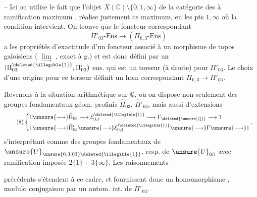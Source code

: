 
-- Ici on utilise le fait que l'objet $X(\mathbb C)\setminus\{0,1,\infty\}$ de la catégorie des  à ramification maximum , réalise justement ce maximum, en les pts $1,\infty$ où la condition intervient.
On trouve que le foncteur correspondant
\[
\tag{7 bis}
\Pi'_{03}\text{-}\mathrm{Ens}\longrightarrow(\Pi_{0,3}\text{-}\mathrm{Ens})
\]
a les propriétés d'exactitude d'un foncteur associé à un morphisme de topos galoisiens
( $\underset{\longrightarrow}{\lim}$ , exact à g.) et est donc défini par un $(\Pi_{03}^{\deleted{\illegible{1}}},\Pi'_{03})$ ens. qui est un torseur (à droite) pour $\Pi'_{03}$. Le choix d'une origine pour ce torseur définit  un hom correspondant $\Pi_{0,3}\longrightarrow\Pi'_{03}$.


Revenons à la situation arithmétique sur $\mathbb Q$, où on dispose non seulement des groupes fondamentaux géom. profinis $\widehat{\Pi}_{03}$, $\widehat{\Pi}'_{03}$, mais aussi d'extensions
\[
\tag{8}
\left\{\begin{aligned}
1&\unsure{\longrightarrow}\widehat{\Pi}_{03}\longrightarrow\mathcal E_{0,3}^{\deleted{\illegible{1}}}\longrightarrow\Gamma_{\deleted{\unsure{\mathbb Q}}}\longrightarrow1\\
1&\unsure{\longrightarrow}\widehat{\Pi}'_{03}\unsure{\longrightarrow}\mathcal E_{0,3}^{\prime\deleted{\illegible{1}}}\unsure{\longrightarrow}\Gamma\unsure{\longrightarrow}1
\end{aligned}\right.,
\]
s'interprétant comme des groupes fondamentaux de $\unsure{U}_{\unsure{0,3|03}\deleted{\illegible{1}}}$, resp. de $\unsure{U}_{03}$ avec ramification imposée $2\{1\}+3\{\infty\}$. Les raisonnements


précédents s'étendent à ce cadre, et fournissent donc un homomorphisme  
,
modulo conjugaison par un autom. int. de $\Pi'_{03}$.

